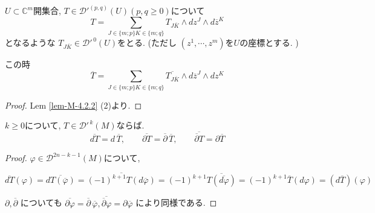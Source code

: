 \begin{tcolorbox}[mybox]
\begin{cor}
\label{cor-M-4.2.3}
 \( U\subset \mathbb{C}^m \)開集合,  \( T\in \mathcal{D}'^{(p,q)}(U) (p,q\geq 0) \)について
$$
 T=\sum_{J \in \{m ; p\} K \in \{m ; q\} } 
 T_{J\overline{K}} \wedge dz^J \wedge d\overline{z}^K 
 $$
 となるような
 \( T_{J\overline{K}}\in \mathcal{D}'^{\,0}(U)\)をとる. 
 (ただし \((z^1,\cdots,z^m)\)を$U$の座標とする. )

この時
\[
\overline{T}
=
\sum_{J \in \{m ; p\} K \in \{m ; q\} } 
 \overline{T_{J\overline{K}}} \wedge d\overline{z}^J \wedge d z^K 
\]
\end{cor}
\end{tcolorbox}
\begin{proof}
 Lem \ref{lem-M-4.2.2} (2)より.
\end{proof}

\begin{tcolorbox}[mybox]
\begin{lem}
\label{lem-M-4.2.4}
\( k\geq 0 \)について, $T\in \mathcal{D}'^{\,k}(M)$ならば. 
\[
\overline{dT}=d\,\overline{T},
\qquad
\overline{\partial T}=\overline{\partial}\,\overline{T},
\qquad
\overline{\overline{\partial}T}=\partial \overline{T}
\]
\end{lem}
\end{tcolorbox}
\begin{proof}

\(  \varphi\in \mathcal{D}^{2n-k-1}(M) \)について, 

\[
\overline{dT}(\varphi)
=
\overline{dT(\overline{\varphi})}
=
\overline{(-1)^{k+1}T(d\overline{\varphi})}
=
(-1)^{k+1}\overline{T(\overline{d\varphi})}
=
(-1)^{k+1}\overline{T}(d\varphi)
=
(d\overline{T})(\varphi)
\]


\( \partial,\overline{\partial} \) についても
\(
\overline{\partial \varphi}=\overline{\partial}\,\overline{\varphi},
\overline{\overline{\partial}\varphi}=\partial \overline{\varphi}
\)
により同様である. 
\end{proof}

